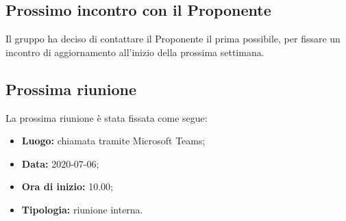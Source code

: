 	\subsection{Prossimo incontro con il Proponente}
	Il gruppo ha deciso di contattare il Proponente il prima possibile, per fissare un incontro di aggiornamento all'inizio della prossima settimana.
	\pagebreak
	\subsection{Prossima riunione}
		La prossima riunione è stata fissata come segue:
		\begin{itemize}
			\item \textbf{Luogo:} chiamata tramite Microsoft Teams; 
			\item \textbf{Data:} 2020-07-06;
			\item \textbf{Ora di inizio:} 10.00;
			\item \textbf{Tipologia:} riunione interna.
		\end{itemize}